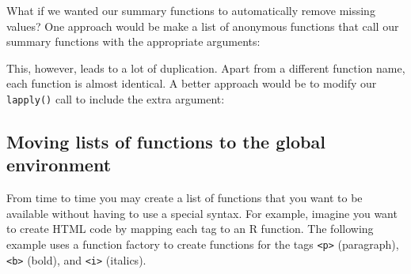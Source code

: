 What if we wanted our summary functions to automatically remove missing
values? One approach would be make a list of anonymous functions that
call our summary functions with the appropriate arguments:\vspace*{-4pt}

\begin{Shaded}
\begin{Highlighting}[]
\StringTok{ }\NormalTok{(}
    \NormalTok{),}
    \NormalTok{),}
    \NormalTok{)}
\NormalTok{)}
\CommentTok{#> }
\CommentTok{#> }
\end{Highlighting}
\end{Shaded}\vspace*{-6pt}

This, however, leads to a lot of duplication. Apart from a different
function name, each function is almost identical. A better approach
would be to modify our \texttt{lapply()} call to include the extra
argument:

\begin{Shaded}
\begin{Highlighting}[]
 \NormalTok{))}
\end{Highlighting}
\end{Shaded}

\subsection{Moving lists of functions to the global environment}

From time to time you may create a list of functions that you want to be
available without having to use a special syntax. For example, imagine
you want to create HTML code by mapping each tag to an R function. The
following example uses a function factory to create functions for the
tags \texttt{\textless{}p\textgreater{}} (paragraph),
\texttt{\textless{}b\textgreater{}} (bold), and
\texttt{\textless{}i\textgreater{}} (italics).

